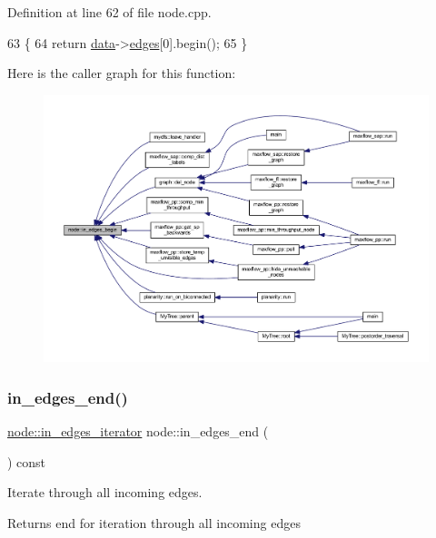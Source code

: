 Definition at line 62 of file node.\+cpp.


\begin{DoxyCode}
63 \{
64     \textcolor{keywordflow}{return} \mbox{\hyperlink{classnode_a4ae3d54ebb61be3a102bedf5b91bef75}{data}}->\mbox{\hyperlink{classnode__data_a91690d6d2594423c2cdf8ea083c8bd75}{edges}}[0].begin();
65 \}
\end{DoxyCode}
Here is the caller graph for this function\+:\nopagebreak
\begin{figure}[H]
\begin{center}
\leavevmode
\includegraphics[width=350pt]{classnode_a0c32377f370ae52ed2134ff8d4dac584_icgraph}
\end{center}
\end{figure}
\mbox{\label{classnode_a785cd330f8b4c5c47d3b6e936a7e744e}} 
\subsubsection{\texorpdfstring{in\+\_\+edges\+\_\+end()}{in\_edges\_end()}}
{\footnotesize\ttfamily \mbox{\hyperlink{classnode_a9a96be92add7c1a2771bcd0431ebf8ab}{node\+::in\+\_\+edges\+\_\+iterator}} node\+::in\+\_\+edges\+\_\+end (\begin{DoxyParamCaption}{ }\end{DoxyParamCaption}) const}

Iterate through all incoming edges.

\begin{DoxyReturn}{Returns}
end for iteration through all incoming edges 
\end{DoxyReturn}


